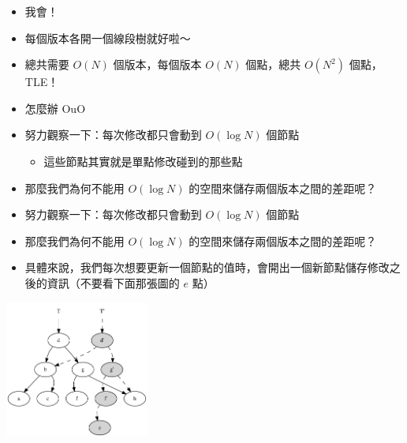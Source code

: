 \documentclass[standalone]{beamer}
\begin{document}
\begin{frame}[fragile]{}
  \begin{itemize}
    \item 我會！
    \item 每個版本各開一個線段樹就好啦～
    \item 總共需要 $O(N)$ 個版本，每個版本 $O(N)$ 個點，總共 $O(N^2)$ 個點，TLE！
    \item 怎麼辦 OuO
  \end{itemize}
\end{frame}

\begin{frame}[fragile]{}
  \begin{itemize}
    \item 努力觀察一下：每次修改都只會動到 $O(\log N)$ 個節點
      \begin{itemize}
        \item 這些節點其實就是單點修改碰到的那些點
      \end{itemize}
    \item 那麼我們為何不能用 $O(\log N)$ 的空間來儲存兩個版本之間的差距呢？
  \end{itemize}
\end{frame}

\begin{frame}[fragile]{}
  \begin{itemize}
    \item 努力觀察一下：每次修改都只會動到 $O(\log N)$ 個節點
    \item 那麼我們為何不能用 $O(\log N)$ 的空間來儲存兩個版本之間的差距呢？
    \item 具體來說，我們每次想要更新一個節點的值時，會開出一個新節點儲存修改之後的資訊（不要看下面那張圖的 $e$ 點）
  \end{itemize}
  \includegraphics[height=4.5cm]{figures/persistent-tree.pdf}
\end{frame}
\end{document}
